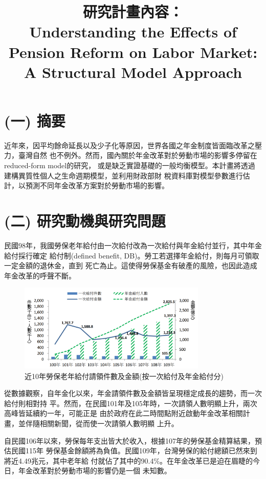 \documentclass[12pt]{article}
\title{研究計畫內容：\\
Understanding the Effects of Pension Reform on Labor Market: A Structural 
Model Approach}
\date{}
\begin{document}
\begin{CJK*}{UTF8}{bkai}

\maketitle

\section*{\normalfont(一) 摘要}
近年來，因平均餘命延長以及少子化等原因，世界各國之年金制度皆面臨改革之壓力，臺灣自然
也不例外。然而，國內關於年金改革對於勞動市場的影響多停留在reduced-form model的研究，
或是缺乏實證基礎的一般均衡模型。本計畫將透過建構異質性個人之生命週期模型，並利用財政部財
稅資料庫對模型參數進行估計，以預測不同年金改革方案對於勞動市場的影響。
\section*{\normalfont(二) 研究動機與研究問題}
民國98年，我國勞保老年給付由一次給付改為一次給付與年金給付並行，其中年金給付採行確定
給付制(defined benefit, DB)。勞工若選擇年金給付，則每月可領取一定金額的退休金，直到
死亡為止。這使得勞保基金有破產的風險，也因此造成年金改革的呼聲不斷。
\begin{figure}[htbp]
    \centering
    \includegraphics[width=0.8\textwidth]{tw_pension_pay.png}
    \caption{近10年勞保老年給付請領件數及金額(按一次給付及年金給付分)\protect\footnotemark}
\end{figure}

從數據觀察，自年金化以來，年金請領件數及金額皆呈現穩定成長的趨勢，而一次給付則相對持
平。然而，在民國101年及105年時，一次請領人數明顯上升，兩次高峰皆延續約一年，可能正是
由於政府在此二時間點附近啟動年金改革相關計畫，並伴隨相關新聞，從而使一次請領人數明顯
上升。

自民國106年以來，勞保每年支出皆大於收入，根據107年的勞保基金精算結果，預估民國115年
勞保基金餘額將為負值。民國109年，台灣勞保的給付總額已然來到將近4.49兆元，其中老年給
付就佔了其中的90.4\%。在年金改革已是迫在眉睫的今日，年金改革對於勞動市場的影響仍是一個
未知數。


\end{CJK*}
\end{document}
